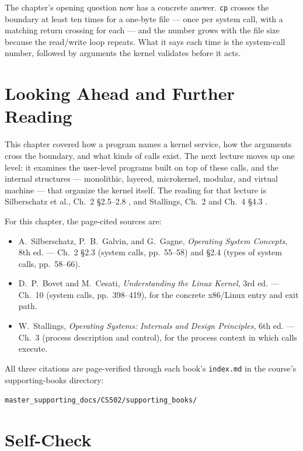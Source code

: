 \documentclass[11pt]{article}
\begin{document}
The chapter's opening question now has a concrete answer. \texttt{cp} crosses
the boundary at least ten times for a one-byte file --- once per system call,
with a matching return crossing for each --- and the number grows with the file
size because the read/write loop repeats. What it says each time is the
system-call number, followed by arguments the kernel validates before it acts.

\section{Looking Ahead and Further Reading}

This chapter covered how a program names a kernel service, how the arguments
cross the boundary, and what kinds of calls exist. The next lecture moves up
one level: it examines the user-level programs built on top of these calls, and
the internal structures --- monolithic, layered, microkernel, modular, and
virtual machine --- that organize the kernel itself. The reading for that
lecture is Silberschatz et al., Ch.~2 \S2.5--2.8
\cite{SilberschatzOSC_operating_system_concepts}, and Stallings, Ch.~2 and
Ch.~4 \S4.3 \cite{StallingsOS_internals_design_principles}.

For this chapter, the page-cited sources are:

\begin{itemize}
  \item A.~Silberschatz, P.~B.~Galvin, and G.~Gagne, \emph{Operating System
        Concepts}, 8th ed. --- Ch.~2 \S2.3 (system calls, pp.~55--58) and
        \S2.4 (types of system calls, pp.~58--66).
  \item D.~P.~Bovet and M.~Cesati, \emph{Understanding the Linux Kernel}, 3rd
        ed. --- Ch.~10 (system calls, pp.~398--419), for the concrete
        x86/Linux entry and exit path.
  \item W.~Stallings, \emph{Operating Systems: Internals and Design
        Principles}, 6th ed. --- Ch.~3 (process description and control), for
        the process context in which calls execute.
\end{itemize}

\noindent
All three citations are page-verified through each book's \texttt{index.md} in
the course's supporting-books directory:
\begin{center}
\texttt{master\_supporting\_docs/CS502/supporting\_books/}
\end{center}

\section*{Self-Check}
\end{document}
